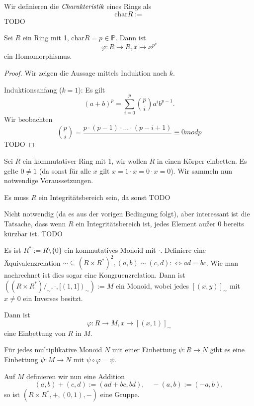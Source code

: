 \begin{definition}
    Wir definieren die $\emph{Charakteristik}$ eines Rings als
    $$ \mathrm{char}{R} := $$
    TODO
\end{definition}

\begin{proposition}
    Sei $R$ ein Ring mit 1, $\mathrm{char} R = p \in \mathbb{P}$. Dann ist
    $$ \varphi : R \to R, x \mapsto x^{p^k} $$
    ein Homomorphismus.
\end{proposition}

\begin{proof}
    Wir zeigen die Aussage mittels Induktion nach $k$.

    Induktionsanfang ($k = 1$): Es gilt
    $$ (a+b)^p = \sum_{i=0}^p {p \choose i} a^i b^{p-1}. $$
    Wir beobachten
    $$ {p \choose i} = \frac{p \cdot (p-1) \cdot \hdots \cdot (p-i+1)}{} \equiv 0 mod p $$
    TODO
\end{proof}

\begin{remark}
    Sei $R$ ein kommutativer Ring mit 1, wir wollen $R$ in einen Körper einbetten. Es gelte \obda $0 \neq 1$ (da sonst für alle $x$ gilt $ x = 1\cdot x = 0 \cdot x = 0$). Wir sammeln nun notwendige Voraussetzungen.

    Es muss $R$ ein Integritätsbereich sein, da sonst
    TODO

    Nicht notwendig (da es aus der vorigen Bedingung folgt), aber interessant ist die Tatsache, dass wenn $R$ ein Integritätsbereich ist, jedes Element außer $0$ bereits kürzbar ist.
    TODO

    Es ist $R^* := R \setminus \{0\}$ ein kommutatives Monoid mit $\cdot$. Definiere eine Äquivalenzrelation $\sim \subseteq (R \times R^*)^2, (a, b) \sim (c, d) :\Leftrightarrow ad = bc$. Wie man nachrechnet ist dies sogar eine Kongruenzrelation. Dann ist $((R \times R^*)/_\sim, \cdot, [(1,1])_\sim) := M$ ein Monoid, wobei jedes $[(x,y)]_\sim$ mit $x \neq 0$ ein Inverses besitzt.
    
    Dann ist
    $$ \varphi : R \to M, x \mapsto [(x, 1)]_\sim $$
    eine Einbettung von $R$ in $M$.

    Für jedes multiplikative Monoid $N$ mit einer Einbettung $\psi : R \to N$ gibt es eine Einbettung $\bar{\psi} : M \to N$ mit $\bar{\psi} \circ \varphi = \psi$.

    Auf $M$ definieren wir nun eine Addition
    $$ (a,b) + (c,d) := (ad+bc, bd), \quad -(a,b) := (-a, b), $$
    so ist $(R \times R^*, +, (0,1), -)$ eine Gruppe.
\end{remark}

